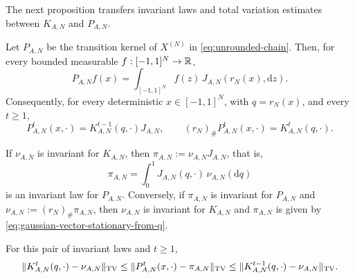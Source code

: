 \documentclass[11pt,reqno,a4paper]{article}
\newcommand{\TV}{\mathrm{TV}}
\begin{document}
The next proposition transfers invariant laws and total variation estimates
between $K_{A,N}$ and $P_{A,N}$.
\begin{proposition}
\label{prop:gaussian-tv-reduction}
  Let $P_{A,N}$ be the transition kernel of $X^{(N)}$ in
  \cref{eq:unrounded-chain}. Then, for every bounded measurable
  $f:[-1,1]^N\to\mathbb{R}$,
  \begin{equation}\label{eq:gaussian-vector-kernel-factorization}
    P_{A,N}f(x)
    =
    \int_{[-1,1]^N} f(z)\,J_{A,N}(r_N(x),\mathrm{d}z).
  \end{equation}
  Consequently, for every deterministic $x\in[-1,1]^N$, with
  $q=r_N(x)$, and every $t\geq1$,
  \begin{equation}\label{eq:gaussian-vector-radius-laws}
    P_{A,N}^t(x,\cdot)=K_{A,N}^{t-1}(q,\cdot)J_{A,N},
    \qquad
    (r_N)_\#P_{A,N}^t(x,\cdot)=K_{A,N}^{t}(q,\cdot).
  \end{equation}

  If $\nu_{A,N}$ is invariant for $K_{A,N}$, then
  $\pi_{A,N}:=\nu_{A,N}J_{A,N}$, that is,
  \begin{equation}\label{eq:gaussian-vector-stationary-from-q}
    \pi_{A,N}
    =
    \int_0^1 J_{A,N}(q,\cdot)\,\nu_{A,N}(\mathrm{d}q)
  \end{equation}
  is an invariant law for $P_{A,N}$. Conversely, if $\pi_{A,N}$ is invariant
  for $P_{A,N}$ and $\nu_{A,N}:=(r_N)_\#\pi_{A,N}$, then $\nu_{A,N}$ is
  invariant for $K_{A,N}$ and $\pi_{A,N}$ is given by
  \cref{eq:gaussian-vector-stationary-from-q}.

  For this pair of invariant laws and $t\geq1$,
  \begin{equation}\label{eq:gaussian-tv-bracket}
    \norm{K_{A,N}^t(q,\cdot)-\nu_{A,N}}_{\TV}
    \leq
    \norm{P_{A,N}^t(x,\cdot)-\pi_{A,N}}_{\TV}
    \leq
    \norm{K_{A,N}^{t-1}(q,\cdot)-\nu_{A,N}}_{\TV}.
  \end{equation}
\end{proposition}
\end{document}
